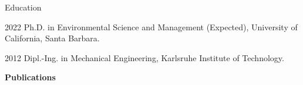 \begin{vitae}

\begin{vitaesection}{Education}
\vspace{-0.1cm}
\item [2022]	Ph.D. in Environmental Science and Management (Expected), University of California, Santa Barbara.
\item [2012]	Dipl.-Ing. in Mechanical Engineering, Karlsruhe Institute of Technology.
\end{vitaesection}

\textbf{Publications}

        
        
        
    
    





\end{vitae}
